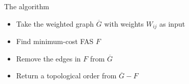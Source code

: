 	\begin{frame}
		\begin{block}{The algorithm}
			\begin{itemize}
				\item Take the weighted graph $\overline G$ with weights $W_{ij}$ as input
				\item Find minimum-cost FAS $F$
				\item Remove the edges in $F$ from $\overline G$
				\item Return a topological order from $\overline G - F$
			\end{itemize}
		\end{block}
	\end{frame}